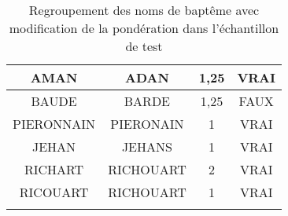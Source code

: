 \begin{center}
\begin{longtable}{|c|c|c|c|}
        \hline	AMAN	&	ADAN	&	1,25	&	VRAI	\\
        \hline	BAUDE	&	BARDE	&	1,25	&	FAUX	\\
        \hline	PIERONNAIN	&	PIERONAIN	&	1	&	VRAI	\\
        \hline	JEHAN	&	JEHANS	&	1	&	VRAI	\\
        \hline	RICHART	&	RICHOUART	&	2	&	VRAI	\\
        \hline	RICOUART	&	RICHOUART	&	1	&	VRAI	\\
        \hline
        \caption{Regroupement des noms de baptême avec modification de la pondération dans l'échantillon de test}
        \label{test_prenom_md}
    \end{longtable}
\end{center}
\normalsize